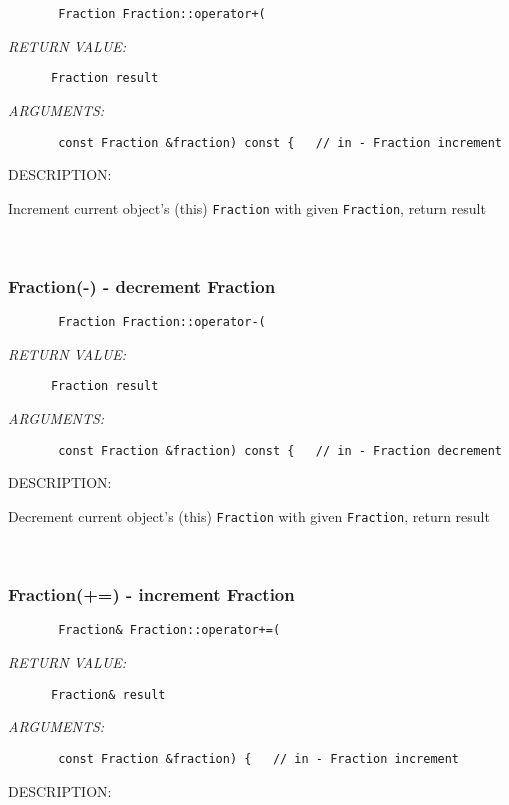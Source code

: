   
\begin{verbatim}       Fraction Fraction::operator+(\end{verbatim}{\em RETURN VALUE:}
\begin{verbatim}      Fraction result\end{verbatim}{\em ARGUMENTS:}
\begin{verbatim}       const Fraction &fraction) const {   // in - Fraction increment\end{verbatim}
{\sf DESCRIPTION:\\ }


        Increment current object's (this) {\tt Fraction} with given
        {\tt Fraction}, return result
   
 
\mbox{}\hrulefill\ 
 
\subsubsection [Fraction(-)] {Fraction(-) - decrement Fraction}


  
\begin{verbatim}       Fraction Fraction::operator-(\end{verbatim}{\em RETURN VALUE:}
\begin{verbatim}      Fraction result\end{verbatim}{\em ARGUMENTS:}
\begin{verbatim}       const Fraction &fraction) const {   // in - Fraction decrement\end{verbatim}
{\sf DESCRIPTION:\\ }


        Decrement current object's (this) {\tt Fraction} with given
        {\tt Fraction}, return result
   
 
\mbox{}\hrulefill\ 
 
\subsubsection [Fraction(+=)] {Fraction(+=) - increment Fraction}


  
\begin{verbatim}       Fraction& Fraction::operator+=(\end{verbatim}{\em RETURN VALUE:}
\begin{verbatim}      Fraction& result\end{verbatim}{\em ARGUMENTS:}
\begin{verbatim}       const Fraction &fraction) {   // in - Fraction increment\end{verbatim}
{\sf DESCRIPTION:\\ }



